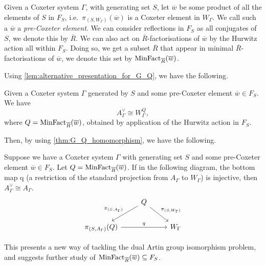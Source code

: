 Given a Coxeter system $\Gamma$, with generating set $S$, let $\overline{w}$ be some product of  all the elements of $S$ in  $F_S$, i.e.~$\pi_{(S,W_\Gamma)}(\overline{w})$ is a Coxeter element in $W_\Gamma$.
We call such a $\overline{w}$ a \emph{pre-Coxeter element}.
We can consider reflections in $F_S$ as all conjugates of  $S$, we denote this by  $\overline{R}$.
We can also act on $\overline{R}$-factorisations of $\overline{w}$ by the Hurwitz action all within $F_S$.
Doing so, we get a subset $\overline{R}$ that appear in minimal $\overline{R}$-factorisations of $\overline{w}$, we denote this set by $\operatorname{MinFact}_{\overline{R}}(\overline{w})$.

Using \cref{lem:alternative_presentation_for_G_Q}, we have the following.

\begin{lemma}
	Given a Coxeter system $\Gamma$ generated by  $S$ and some pre-Coxeter element $\overline{w} \in F_S$.
	We have
	\[
		A^\vee_\Gamma \cong W_\Gamma^Q
		,\] where  $Q=\operatorname{MinFact}_{\overline{R}}(\overline{w})$, obtained by application of the Hurwitz action in  $F_S$.
\end{lemma}

Then, by using \cref{thm:G_Q_homomorphism}, we have the following.

\begin{proposition}
	Suppose we have a Coxeter system $\Gamma$ with generating set $S$ and some pre-Coxeter element $\overline{w} \in F_S$.
	Let $Q = \operatorname{MinFact}_{\overline{R}}(\overline{w})$.
	If in the following diagram, the bottom map q (a restriction of the standard projection from $A_\Gamma$ to  $W_\Gamma$) is injective, then $A^\vee_\Gamma \cong A_\Gamma$.
	\[
		\begin{tikzcd}
			& Q \ar[dl, "\pi_{(S,A_\Gamma)}"'] \ar[dr, "\pi_{(S,W_\Gamma)}"] & \\
			\pi_{(S,A_\Gamma)}(Q) \ar[rr, "q"] & & W_\Gamma
		\end{tikzcd}
	\]
\end{proposition}

This presents a new way of tackling the dual Artin group isomorphism problem, and suggests further study of $\operatorname{MinFact}_{\overline{R}}(\overline{w}) \subseteq F_S$.
